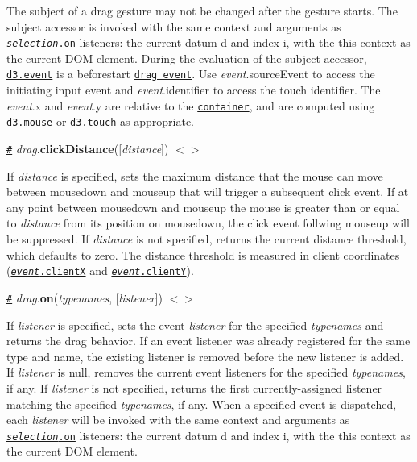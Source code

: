 The subject of a drag gesture may not be changed after the gesture starts. The subject accessor is invoked with the same context and arguments as \href{https://github.com/d3/d3-selection#selection_on}{\tt {\itshape selection}.on} listeners\+: the current datum {\ttfamily d} and index {\ttfamily i}, with the {\ttfamily this} context as the current D\+OM element. During the evaluation of the subject accessor, \href{https://github.com/d3/d3-selection#event}{\tt d3.\+event} is a beforestart \href{#drag-events}{\tt drag event}. Use {\itshape event}.source\+Event to access the initiating input event and {\itshape event}.identifier to access the touch identifier. The {\itshape event}.x and {\itshape event}.y are relative to the \href{#drag_container}{\tt container}, and are computed using \href{https://github.com/d3/d3-selection#mouse}{\tt d3.\+mouse} or \href{https://github.com/d3/d3-selection#touch}{\tt d3.\+touch} as appropriate.

\href{#drag_clickDistance}{\tt \#} {\itshape drag}.{\bfseries click\+Distance}(\mbox{[}{\itshape distance}\mbox{]}) \href{https://github.com/d3/d3-drag/blob/master/src/drag.js#L162}{\tt $<$$>$}

If {\itshape distance} is specified, sets the maximum distance that the mouse can move between mousedown and mouseup that will trigger a subsequent click event. If at any point between mousedown and mouseup the mouse is greater than or equal to {\itshape distance} from its position on mousedown, the click event follwing mouseup will be suppressed. If {\itshape distance} is not specified, returns the current distance threshold, which defaults to zero. The distance threshold is measured in client coordinates (\href{https://developer.mozilla.org/en-US/docs/Web/API/MouseEvent/clientX}{\tt {\itshape event}.clientX} and \href{https://developer.mozilla.org/en-US/docs/Web/API/MouseEvent/clientY}{\tt {\itshape event}.clientY}).

\href{#drag_on}{\tt \#} {\itshape drag}.{\bfseries on}({\itshape typenames}, \mbox{[}{\itshape listener}\mbox{]}) \href{https://github.com/d3/d3-drag/blob/master/src/drag.js#L157}{\tt $<$$>$}

If {\itshape listener} is specified, sets the event {\itshape listener} for the specified {\itshape typenames} and returns the drag behavior. If an event listener was already registered for the same type and name, the existing listener is removed before the new listener is added. If {\itshape listener} is null, removes the current event listeners for the specified {\itshape typenames}, if any. If {\itshape listener} is not specified, returns the first currently-\/assigned listener matching the specified {\itshape typenames}, if any. When a specified event is dispatched, each {\itshape listener} will be invoked with the same context and arguments as \href{https://github.com/d3/d3-selection#selection_on}{\tt {\itshape selection}.on} listeners\+: the current datum {\ttfamily d} and index {\ttfamily i}, with the {\ttfamily this} context as the current D\+OM element.

